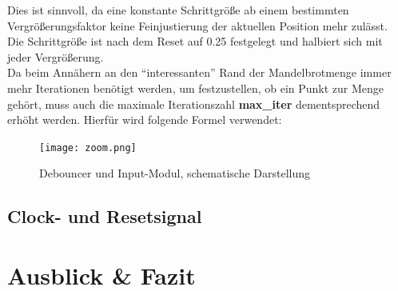 \documentclass[a4paper,12pt,onesided]{report}
\begin{document}
Dies ist sinnvoll, da eine konstante Schrittgröße ab einem bestimmten Vergrößerungsfaktor keine Feinjustierung der aktuellen Position mehr zulässt.\\
Die Schrittgröße ist nach dem Reset auf 0.25 festgelegt und halbiert sich mit jeder Vergrößerung.\\
Da beim Annähern an den "`interessanten"' Rand der Mandelbrotmenge immer mehr Iterationen benötigt werden, um festzustellen, ob ein Punkt zur Menge gehört, muss auch die maximale Iterationszahl \textbf{max\_iter} dementsprechend erhöht werden.
Hierfür wird folgende Formel verwendet:
\begin{figure}[H]
	\centering
	\texttt{[image: zoom.png]}
	\caption{Debouncer und Input-Modul, schematische Darstellung}
	\label{fig:zoom}
\end{figure}

\section{Clock- und Resetsignal}

\chapter{Ausblick \& Fazit}

{}

\end{document}
